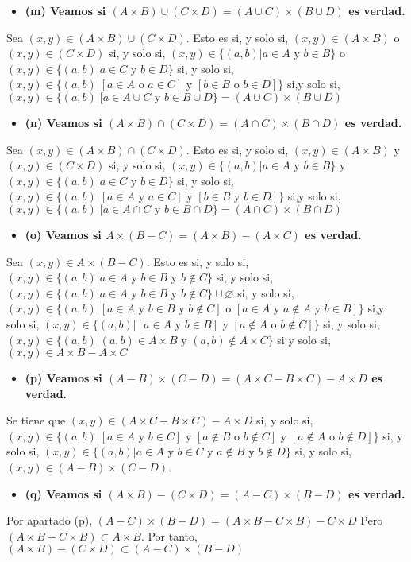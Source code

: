\documentclass{article}
\begin{document}
\begin{itemize}
\item \bf (m) \rm Veamos si  $(A\times B )\cup (C\times D)=(A\cup C)\times ( B\cup D)$ es verdad.
\end{itemize}
Sea $(x,y)\in (A\times B )\cup (C\times D)$. Esto es si, y solo si, $(x,y)\in (A\times B)$ o $ (x,y)\in(C\times D)$ si, y solo si, $(x,y)\in \{(a,b)|a\in A\text{ y } b\in B\}$ o $(x,y)\in \{(a,b)|a\in C\text{ y } b\in D\}$ si, y solo si, $(x,y)\in \{(a,b)|[a\in A\text{ o } a\in C]\text{ y } [b\in B\text{ o } b\in D]\}$ si,y solo si, $(x,y)\in \{(a,b)|[a\in A\cup C\text{ y } b\in B\cup D\}=(A\cup C)\times ( B\cup D)$
\begin{itemize}
\item \bf (n) \rm Veamos si  $(A\times B )\cap (C\times D)=(A\cap C)\times ( B\cap D)$ es verdad.
\end{itemize}
Sea $(x,y)\in (A\times B )\cap (C\times D)$. Esto es si, y solo si, $(x,y)\in (A\times B)$ y $ (x,y)\in(C\times D)$ si, y solo si, $(x,y)\in \{(a,b)|a\in A\text{ y } b\in B\}$ y $(x,y)\in \{(a,b)|a\in C\text{ y } b\in D\}$ si, y solo si, $(x,y)\in \{(a,b)|[a\in A\text{ y } a\in C]\text{ y } [b\in B\text{ y } b\in D]\}$ si,y solo si, $(x,y)\in \{(a,b)|[a\in A\cap C\text{ y } b\in B\cap D\}=(A\cap C)\times ( B\cap D)$
\begin{itemize}
\item \bf (o) \rm Veamos si  $A\times ( B-C )= (A \times B) -( A\times C)$ es verdad.
\end{itemize}
Sea $(x,y)\in A\times (B - C)$. Esto es si, y solo si, $(x,y)\in \{(a,b)|a\in A\text{ y } b\in B\text{ y } b\notin C\}$ si, y solo si, $(x,y)\in \{(a,b)|a\in A\text{ y } b\in B\text{ y } b\notin C\}\cup \varnothing$ si, y solo si, $(x,y)\in \{(a,b)|[a\in A\text{ y } b\in B\text{ y } b\notin C] \text{ o }[a\in A\text{ y }a\notin A\text{ y } b\in B]\}$ si,y solo si, $(x,y)\in \{(a,b)|[a\in A\text{ y } b\in B]\text{ y } [a\notin A \text{ o }b\notin C]\}$ si, y solo si, $(x,y)\in \{(a,b)|(a,b)\in A\times B\text{ y } (a,b)\notin A\times C\}$ si y solo si, $(x,y)\in A\times B-A\times C$
\begin{itemize}
\item \bf (p) \rm Veamos si  $(A-  B)\times (C-D )= (A \times C- B\times C)-A\times D$ es verdad.
\end{itemize}
Se tiene que $(x,y)\in(A \times C- B\times C)-A\times D$ si, y solo si, $(x,y)\in\{(a,b)| [a\in A \text{ y } b\in C]\text{ y }[a\notin B \text{ o }b\notin C]\text{ y }[a\notin A\text{ o }b\notin D]\}$ si, y solo si, $(x,y)\in\{(a,b)| a\in A \text{ y } b\in C \text{ y }a\notin B \text{ y }b\notin D\}$ si, y solo si, $(x,y)\in (A-B)\times (C-D)$.
\begin{itemize}
\item \bf (q) \rm Veamos si $(A\times B )- (C\times D)=(A-C)\times ( B- D)$ es verdad.
\end{itemize}
Por apartado (p), $(A-C)\times ( B- D)=(A \times B- C\times B)-C\times D$ Pero $(A \times B- C\times B)\subset A\times B$. Por tanto, $(A\times B )- (C\times D)\subset (A-C)\times ( B- D)$
\end{document}
